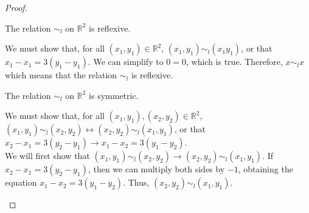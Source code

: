 \documentclass[11pt]{scrartcl}
\theoremstyle{dotlessP}
\theoremstyle{dotlessN}
\newcommand{\lra}{\leftrightarrow}
\newcommand{\reals}{\mathbb{R}} %
\begin{document}
\begin{enumerate}[(a)]
\begin{proof}
			\begin{claim*}
				The relation  $\sim_l$ on $\reals^2$ is reflexive.
			\end{claim*}
			\begin{subproof}
				[Subproof]
				We must show that, for all $(x_1,y_1) \in \reals^2$, $(x_1,y_1) \sim_l (x_1y_1)$, or that $x_1 - x_1 = 3(y_1 - y_1)$. We can simplify to $0=0$, which is true. Therefore, $x \sim_l x$ which means that the relation $\sim_l$ is reflexive. 
			\end{subproof}
			\begin{claim*}
				The relation $\sim_l$ on $\reals^2$ is symmetric.
			\end{claim*}
			\begin{subproof}
				[Subproof]
				We must show that, for all $(x_1,y_1), (x_2,y_2) \in \reals^2$, $(x_1,y_1) \sim_l (x_2,y_2) \lra (x_2, y_2) \sim_l (x_1, y_1)$, or that $x_2 - x_1 = 3(y_2 - y_1) \to x_1 - x_2 = 3(y_1 - y_2)$. 
\\

We will first show that $(x_1, y_1) \sim_l (x_2, y_2) \to (x_2, y_2) \sim_l (x_1, y_1)$. If $x_2 - x_1 = 3(y_2 - y_1)$, then we can multiply both sides by $-1$, obtaining the equation $x_1 - x_2 = 3(y_1 - y_2)$. Thus, $(x_2, y_2) \sim_l (x_1, y_1)$.
\\


\end{subproof}
\end{proof}
\end{enumerate}
\end{document}
